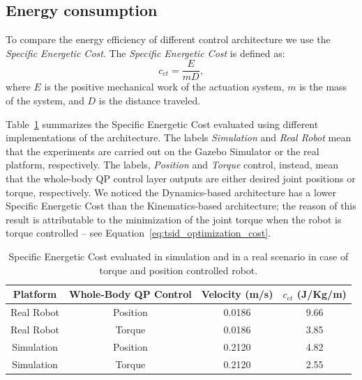 \subsection{Energy consumption}
To compare the energy efficiency of different control architecture we use the \emph{Specific Energetic Cost}. The \emph{Specific Energetic Cost} is defined as: \citep{Torricelli2015BenchmarkingHumans}
\begin{equation}
    c_{et} = \frac{E}{m D},
\end{equation}
where $E$ is the positive mechanical work of the actuation system, $m$ is the mass of the system, and $D$ is the distance traveled. 
\par
Table~\ref{tab:energy_consumption} summarizes the Specific Energetic Cost evaluated using different implementations of the architecture. The labels \emph{Simulation} and \emph{Real Robot} mean that the experiments are carried out on the Gazebo Simulator or the real platform, respectively. The labels, \emph{Position} and \emph{Torque} control, instead, mean that the whole-body QP control layer outputs are either desired joint positions or torque, respectively. 
We noticed the Dynamics-based architecture has a lower Specific Energetic Cost than the Kinematics-based architecture; the reason of this result is attributable to the minimization of the joint torque when the robot is torque controlled -- see Equation~\eqref{eq:tsid_optimization_cost}.

\begin{table}[b]
\centering
\caption{Specific Energetic Cost evaluated in simulation and in a real scenario in case of torque and position controlled robot. \label{tab:energy_consumption}}
{\begin{tabular}{ccc|c} 
Platform & Whole-Body QP Control & Velocity (m/s) & $c_{et}$ (J/Kg/m)\\
\hline
Real Robot & Position & 0.0186  &  9.66\\
Real Robot & Torque & 0.0186  &  3.85\\
Simulation & Position & 0.2120  & 4.82\\
Simulation & Torque & 0.2120  &  2.55\\
\end{tabular}}
\end{table}